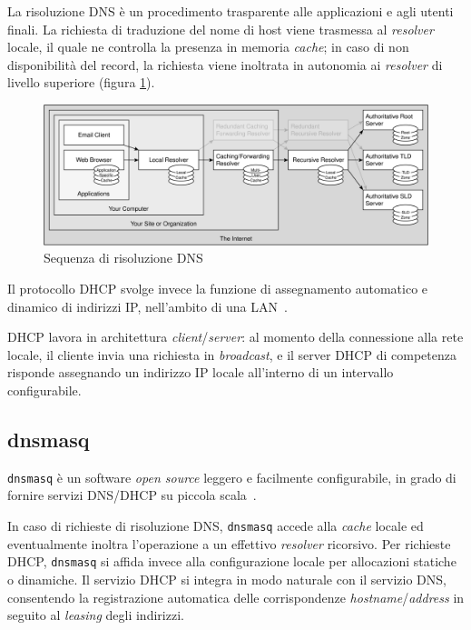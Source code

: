 \documentclass[12pt,a4paper,twoside,openright]{book}
\begin{document}
La risoluzione \ac{DNS} è un procedimento trasparente alle applicazioni e agli utenti finali. La richiesta di traduzione del nome di host viene trasmessa al \textit{resolver} locale, il quale ne controlla la presenza in memoria \textit{cache}; in caso di non disponibilità del record, la richiesta viene inoltrata in autonomia ai \textit{resolver} di livello superiore (figura \ref{fig:dns-resolution}).
\begin{figure}[ht]
    \centering
    \includegraphics[width=0.95\linewidth]{images/dns_resolution.png}
    \caption{Sequenza di risoluzione \ac{DNS}~\cite{dnswiki}}
    \label{fig:dns-resolution}
\end{figure}

Il protocollo \acf{DHCP} svolge invece la funzione di assegnamento automatico e dinamico di indirizzi \ac{IP}, nell'ambito di una \ac{LAN}~\cite{dhcpwiki}.

\ac{DHCP} lavora in architettura \textit{client}/\textit{server}: al momento della connessione alla rete locale, il cliente invia una richiesta in \textit{broadcast}, e il server \ac{DHCP} di competenza risponde assegnando un indirizzo \ac{IP} locale all'interno di un intervallo configurabile.

\subsection{dnsmasq}
\texttt{dnsmasq} è un software \textit{open source} leggero e facilmente configurabile, in grado di fornire servizi \ac{DNS}/\ac{DHCP} su piccola scala~\cite{dnsmasqwiki}.

In caso di richieste di risoluzione \ac{DNS}, \texttt{dnsmasq} accede alla \textit{cache} locale ed eventualmente inoltra l'operazione a un effettivo \textit{resolver} ricorsivo. Per richieste \ac{DHCP}, \texttt{dnsmasq} si affida invece alla configurazione locale per allocazioni statiche o dinamiche. Il servizio \ac{DHCP} si integra in modo naturale con il servizio \ac{DNS}, consentendo la registrazione automatica delle corrispondenze \textit{hostname}/\textit{address} in seguito al \textit{leasing} degli indirizzi.
\end{document}
